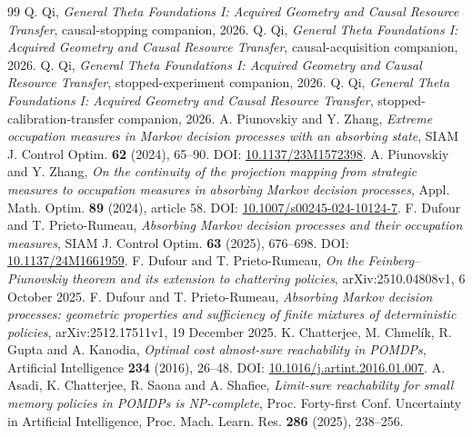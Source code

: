 \begin{thebibliography}{99}
 Q. Qi, \emph{General Theta Foundations I: Acquired Geometry and Causal Resource Transfer}, causal-stopping companion, 2026.
 Q. Qi, \emph{General Theta Foundations I: Acquired Geometry and Causal Resource Transfer}, causal-acquisition companion, 2026.
 Q. Qi, \emph{General Theta Foundations I: Acquired Geometry and Causal Resource Transfer}, stopped-experiment companion, 2026.
 Q. Qi, \emph{General Theta Foundations I: Acquired Geometry and Causal Resource Transfer}, stopped-calibration-transfer companion, 2026.
 A. Piunovskiy and Y. Zhang, \emph{Extreme occupation measures in Markov decision processes with an absorbing state}, SIAM J. Control Optim. \textbf{62} (2024), 65--90. DOI: \href{https://doi.org/10.1137/23M1572398}{10.1137/23M1572398}.
 A. Piunovskiy and Y. Zhang, \emph{On the continuity of the projection mapping from strategic measures to occupation measures in absorbing Markov decision processes}, Appl. Math. Optim. \textbf{89} (2024), article 58. DOI: \href{https://doi.org/10.1007/s00245-024-10124-7}{10.1007/s00245-024-10124-7}.
 F. Dufour and T. Prieto-Rumeau, \emph{Absorbing Markov decision processes and their occupation measures}, SIAM J. Control Optim. \textbf{63} (2025), 676--698. DOI: \href{https://doi.org/10.1137/24M1661959}{10.1137/24M1661959}.
 F. Dufour and T. Prieto-Rumeau, \emph{On the Feinberg--Piunovskiy theorem and its extension to chattering policies}, arXiv:2510.04808v1, 6 October 2025.
 F. Dufour and T. Prieto-Rumeau, \emph{Absorbing Markov decision processes: geometric properties and sufficiency of finite mixtures of deterministic policies}, arXiv:2512.17511v1, 19 December 2025.
 K. Chatterjee, M. Chmel\'ik, R. Gupta and A. Kanodia, \emph{Optimal cost almost-sure reachability in POMDPs}, Artificial Intelligence \textbf{234} (2016), 26--48. DOI: \href{https://doi.org/10.1016/j.artint.2016.01.007}{10.1016/j.artint.2016.01.007}.
 A. Asadi, K. Chatterjee, R. Saona and A. Shafiee, \emph{Limit-sure reachability for small memory policies in POMDPs is NP-complete}, Proc. Forty-first Conf. Uncertainty in Artificial Intelligence, Proc. Mach. Learn. Res. \textbf{286} (2025), 238--256.
\end{thebibliography}
